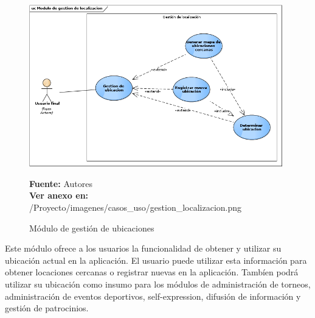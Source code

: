 \begin{figure}[!htb]
  \begin{center}
    \includegraphics[width=11cm]{./imagenes/casos_uso/gestion_localizacion.png}
    \caption{Módulo de gestión de ubicaciones}
    \label{fig:cu_localizacion}
    \textbf{Fuente:} Autores \\
    \textbf{Ver anexo en:} /Proyecto/imagenes/casos\_uso/gestion\_localizacion.png
  \end{center}
\end{figure}

Este módulo ofrece a los usuarios la funcionalidad de obtener y utilizar su ubicación actual en la aplicación. El usuario puede utilizar esta información para obtener locaciones cercanas o registrar nuevas en la aplicación. Tambíen podrá utilizar su ubicación como insumo para los módulos de administración de torneos, administración de eventos deportivos, self-expression, difusión de información y gestión de patrocinios.